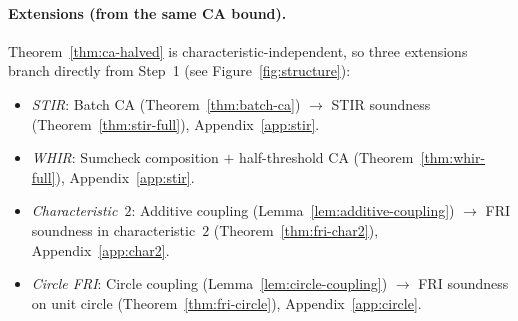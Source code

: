 \documentclass[11pt]{article}
\begin{document}
\paragraph{Extensions (from the same CA bound).}
Theorem~\ref{thm:ca-halved} is characteristic-independent, so three extensions branch directly from Step~1 (see Figure~\ref{fig:structure}):
\begin{itemize}[nosep]
\item \emph{STIR}: Batch CA (Theorem~\ref{thm:batch-ca}) $\to$ STIR soundness (Theorem~\ref{thm:stir-full}), Appendix~\ref{app:stir}.
\item \emph{WHIR}: Sumcheck composition $+$ half-threshold CA (Theorem~\ref{thm:whir-full}), Appendix~\ref{app:stir}.
\item \emph{Characteristic~$2$}: Additive coupling (Lemma~\ref{lem:additive-coupling}) $\to$ FRI soundness in characteristic~$2$ (Theorem~\ref{thm:fri-char2}), Appendix~\ref{app:char2}.
\item \emph{Circle FRI}: Circle coupling (Lemma~\ref{lem:circle-coupling}) $\to$ FRI soundness on unit circle (Theorem~\ref{thm:fri-circle}), Appendix~\ref{app:circle}.
\end{itemize}
\end{document}
